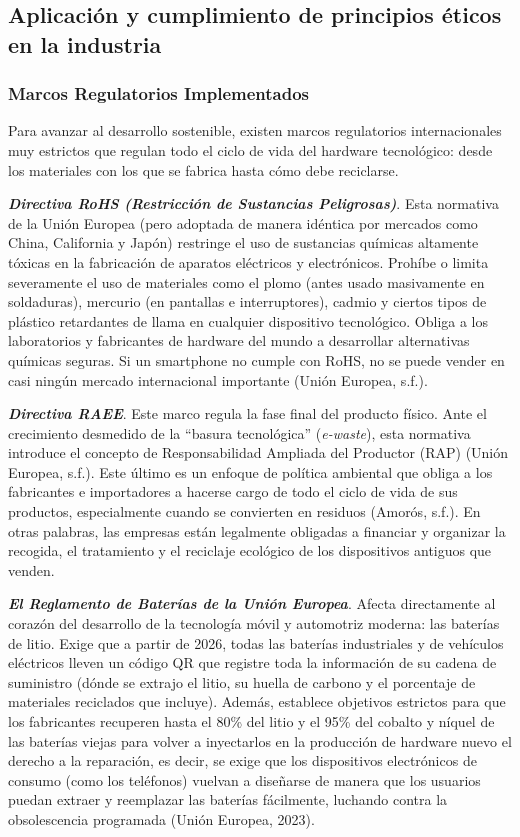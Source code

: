 \documentclass[stu,12pt,a4paper]{apa7}
\begin{document}
    \subsection{Aplicación y cumplimiento de principios éticos en la industria}
    
    \subsubsection{Marcos Regulatorios Implementados}
Para avanzar al desarrollo sostenible, existen marcos regulatorios internacionales muy estrictos que regulan todo el ciclo de vida del hardware tecnológico: desde los materiales con los que se fabrica hasta cómo debe reciclarse.

\textbf{\textit{Directiva RoHS (Restricción de Sustancias Peligrosas)}}. Esta normativa de la Unión Europea (pero adoptada de manera idéntica por mercados como China, California y Japón) restringe el uso de sustancias químicas altamente tóxicas en la fabricación de aparatos eléctricos y electrónicos. Prohíbe o limita severamente el uso de materiales como el plomo (antes usado masivamente en soldaduras), mercurio (en pantallas e interruptores), cadmio y ciertos tipos de plástico retardantes de llama en cualquier dispositivo tecnológico. Obliga a los laboratorios y fabricantes de hardware del mundo a desarrollar alternativas químicas seguras. Si un smartphone no cumple con RoHS, no se puede vender en casi ningún mercado internacional importante (Unión Europea, s.f.).

\textbf{\textit{Directiva RAEE}}. Este marco regula la fase final del producto físico. Ante el crecimiento desmedido de la ``basura tecnológica'' (\textit{e-waste}), esta normativa introduce el concepto de Responsabilidad Ampliada del Productor (RAP) (Unión Europea, s.f.). Este último es un enfoque de política ambiental que obliga a los fabricantes e importadores a hacerse cargo de todo el ciclo de vida de sus productos, especialmente cuando se convierten en residuos (Amorós, s.f.). En otras palabras, las empresas están legalmente obligadas a financiar y organizar la recogida, el tratamiento y el reciclaje ecológico de los dispositivos antiguos que venden.

\textbf{\textit{El Reglamento de Baterías de la Unión Europea}}. Afecta directamente al corazón del desarrollo de la tecnología móvil y automotriz moderna: las baterías de litio. Exige que a partir de 2026, todas las baterías industriales y de vehículos eléctricos lleven un código QR que registre toda la información de su cadena de suministro (dónde se extrajo el litio, su huella de carbono y el porcentaje de materiales reciclados que incluye). Además, establece objetivos estrictos para que los fabricantes recuperen hasta el 80\% del litio y el 95\% del cobalto y níquel de las baterías viejas para volver a inyectarlos en la producción de hardware nuevo el derecho a la reparación, es decir, se exige que los dispositivos electrónicos de consumo (como los teléfonos) vuelvan a diseñarse de manera que los usuarios puedan extraer y reemplazar las baterías fácilmente, luchando contra la obsolescencia programada (Unión Europea, 2023).
\end{document}
